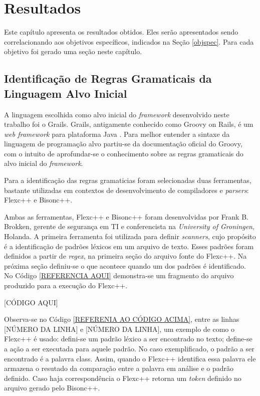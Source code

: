 \chapter[Resultados]{Resultados}
Este capítulo apresenta os resultados obtidos. Eles serão apresentados sendo
correlacionando aos objetivos específicos, indicados na Seção \ref{objspec}.
Para cada objetivo foi gerado uma seção neste capítulo.

\section{Identificação de Regras Gramaticais da Linguagem Alvo Inicial}
A linguagem escolhida como alvo inicial do \textit{framework} desenvolvido
neste trabalho foi o \textsf{Grails}. \textsf{Grails}, antigamente conhecido
como \textsf{Groovy on Rails}, é um \textit{web framework} para plataforma Java
\cite{grails2015}. Para melhor entender a sintaxe da linguagem de programação
alvo partiu-se da documentação oficial do \textsf{Groovy}, com o intuito de
aprofundar-se o conhecimento sobre as regras gramaticais do alvo inicial do
\textit{framework}.

Para a identificação das regras gramaticias foram selecionadas duas ferramentas,
bastante utilizadas em contextos de desenvolvimento de compiladores e
\textit{parsers}: \textsf{Flexc++} e \textsf{Bisonc++}. 

Ambas as ferramentas, \textsf{Flexc++} e \textsf{Bisonc++} foram desenvolvidas
por Frank B. Brokken, gerente de segurança em TI e conferencista na
\textit{University of Groningen}, Holanda. A primeira ferramenta foi utilizada para
definir \textit{scanners}, cujo propósito é a identificação de padrões léxicos em
um arquivo de texto. Esses padrões foram definidos a partir de \textit{regex},
na primeira seção do arquivo fonte do Flexc++. Na próxima seção definiu-se o
que acontece quando um dos padrões é identificado. No Código \ref{REFERENCIA AQUI}
demonstra-se um fragmento do arquivo produzido para a execução do \textsf{Flexc++}.

[CÓDIGO AQUI]

Observa-se no Código \ref{REFERENIA AO CÓDIGO ACIMA}, entre as linhas [NÚMERO
DA LINHA] e [NÚMERO DA LINHA], um exemplo de como o \textsf{Flexc++} é usado:
defini-se um padrão léxico a ser encontrado no texto; define-se a ação a ser
executada para aquele padrão. No caso exemplificado, o padrão a ser encontrado
é a palavra \textsf{class}. Assim, quando o Flexc++ identifica essa palavra ele armazena o resutado da comparação entre a palavra em análise e o padrão definido.
Caso haja correspondência o Flexc++ retorna um \textit{token} definido no
arquivo gerado pelo \textsf{Bisonc++}.






